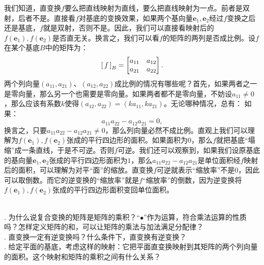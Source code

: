\documentclass[12pt,UTF8]{ctexbook}
\begin{document}
我们知道，直变换$f$要么把直线映射为直线，要么把直线映射为一点。前者是双射，后者不是。直接看$f$对基底的变换效果，如果两个基向量$\mathbf{e}_1,\mathbf{e}_2$经过$f$变换之后还是基底，$f$就是双射，否则不是。因此，我们可以直接看映射后的$f(\mathbf{e}_1),f(\mathbf{e}_2)$是否直无关。换言之，我们可以看$f$的矩阵的两列是否成比例。设$f$在某个基底$B$中的矩阵为：
$$
\bmat{f}[B] = \begin{bmatrix}
    a_{11} & a_{12} \\
    a_{21} & a_{22} 
\end{bmatrix}.
$$
两个列向量$(a_{11},a_{21})$、$(a_{12},a_{22})$成比例的情况有哪些呢？首先，如果两者之一是零向量，那么另一个也需要是零向量。如果两者都不是零向量，不妨设$a_{11}\neq 0$，那么应该有系数$k$使得$(a_{12},a_{22}) = (ka_{11},ka_{21})$。无论哪种情况，总有：
如果：
$$ a_{11} a_{22} - a_{12} a_{21} = 0,$$
换言之，只要$a_{11} a_{22} - a_{12} a_{21}\neq 0$，那么列向量必然不成比例。直观上我们可以理解为$f(\mathbf{e}_1),f(\mathbf{e}_2)$张成的平行四边形的面积。如果面积为$0$，那么$f$就把基底“塌缩”成一条直线，于是不可逆。否则$f$可逆。我们还可以观察到，如果我们设原基底的基向量$\mathbf{e}_1,\mathbf{e}_2$张成的平行四边形面积为$1$，那么$a_{11} a_{22} - a_{12} a_{21}$是单位面积经$f$映射后的面积，可以理解为对平“面”的缩放。直变换$f$可逆就表示“缩放率”不是$0$，因此可以取倒数。而它的逆变换的“缩放率”就是$f$“缩放率”的倒数，因为逆变换将$f(\mathbf{e}_1),f(\mathbf{e}_2)$张成的平行四边形面积变回单位面积。


\begin{sk}
    \mbox{} \\
    . 为什么说复合变换的矩阵是矩阵的乘积？“$\bullet$”作为运算，符合乘法运算的性质吗？怎样定义矩阵的和，可以让矩阵的乘法与加法满足分配律？\\
    . 直变换一定有逆变换吗？什么条件下，直变换有逆变换？\\
    . 给定平面的基底，考虑这样的映射：它把平面直变换映射到其矩阵的两个列向量的面积。这个映射和矩阵的乘积之间有什么关系？
\end{sk}
\end{document}
